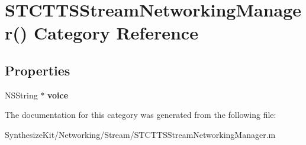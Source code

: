 \hypertarget{category_s_t_c_t_t_s_stream_networking_manager_07_08}{}\section{S\+T\+C\+T\+T\+S\+Stream\+Networking\+Manager() Category Reference}
\label{category_s_t_c_t_t_s_stream_networking_manager_07_08}
\subsection*{Properties}
\begin{DoxyCompactItemize}
\item 
\hypertarget{category_s_t_c_t_t_s_stream_networking_manager_07_08_a5fb28a19999d7bc6e68df29bbb77d0e6}{}\label{category_s_t_c_t_t_s_stream_networking_manager_07_08_a5fb28a19999d7bc6e68df29bbb77d0e6} 
N\+S\+String $\ast$ {\bfseries voice}
\end{DoxyCompactItemize}


The documentation for this category was generated from the following file\+:\begin{DoxyCompactItemize}
\item 
Synthesize\+Kit/\+Networking/\+Stream/S\+T\+C\+T\+T\+S\+Stream\+Networking\+Manager.\+m\end{DoxyCompactItemize}
